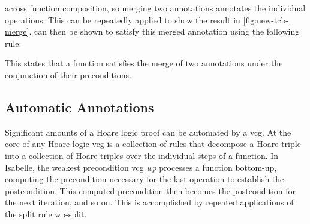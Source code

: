 \documentclass[submission]{eptcs}
\newcommand{\isafun}[1]{{\sf #1}}
\begin{document}
\begin{isabellebody}
\begin{isamarkuptext}
across function composition, so merging two annotations annotates
the individual operations. This can be repeatedly applied to show the result
in \autoref{fig:new-tcb-merge}. \isa{\isafun{new{\isaliteral{5F}{\isacharunderscore}}tcb}}
can then be shown to satisfy this merged annotation
using the following rule:
\begin{center}
 \label{eqn:merge-naf-sub}
\end{center}
This states that a function satisfies the merge of two
annotations under the conjunction of their preconditions.

\subsection*{Automatic Annotations}

Significant amounts of a Hoare logic proof can be
automated by a vcg. At the core of any Hoare logic
vcg is a collection of rules that decompose a Hoare
triple into a collection of Hoare triples over
the individual steps of a function. In Isabelle, the weakest precondition
vcg \emph{wp} processes a function bottom-up, computing the
precondition necessary for the last operation to establish
the postcondition. This computed precondition then becomes
the postcondition for the next iteration, and so on.
This is accomplished by repeated applications of the split rule {\sc wp-split}.


\end{isamarkuptext}
\end{isabellebody}
\end{document}
